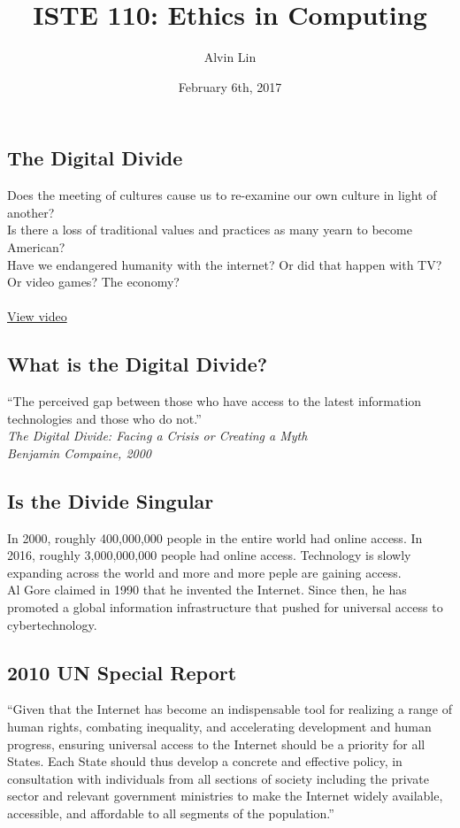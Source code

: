 \documentclass[letterpaper, 12pt]{article}
\title{ISTE 110: Ethics in Computing}
\author{Alvin Lin}
\date{February 6th, 2017}
\begin{document}
\maketitle

\subsection*{The Digital Divide}
Does the meeting of cultures cause us to re-examine our own culture in light of
another? \\
Is there a loss of traditional values and practices as many yearn to become
American? \\
Have we endangered humanity with the internet? Or did that happen with TV? Or
video games? The economy? \\ \\
\href{http://www.theglobeandmail.com/report-on-business/industry-news/marketing/molsons-newest-red-beer-fridge-touts-canadas-multicultural-side/article25116524/}{View video}

\subsection*{What is the Digital Divide?}
``The perceived gap between those who have access to the latest information
technologies and those who do not.'' \\
\textit{The Digital Divide: Facing a Crisis or Creating a Myth} \\
\textit{Benjamin Compaine, 2000}

\subsection*{Is the Divide Singular}
In 2000, roughly 400,000,000 people in the entire world had online access. In
2016, roughly 3,000,000,000 people had online access. Technology is slowly
expanding across the world and more and more peple are gaining access. \\
Al Gore claimed in 1990 that he invented the Internet. Since then, he has
promoted a global information infrastructure that pushed for universal access to
cybertechnology. \\

\subsection*{2010 UN Special Report}
``Given that the Internet has become an indispensable tool for realizing a
range of human rights, combating inequality, and accelerating development and
human progress, ensuring universal access to the Internet should be a priority
for all States. Each State should thus develop a concrete and effective policy,
in consultation with individuals from all sections of society including the
private sector and relevant government ministries to make the Internet widely
available, accessible, and affordable to all segments of the population.''
\end{document}
